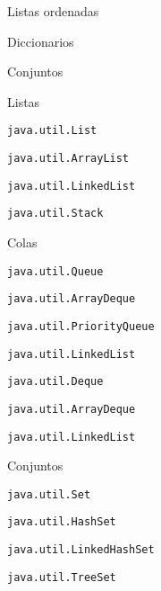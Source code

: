 \begin{longenum}
\begin{longenum}
        \begin{longenum}
            \item Listas ordenadas
            \item Diccionarios
            \item Conjuntos
        \end{longenum}
        \item Listas
        \begin{longenum}
            \item \texttt{java.util.List}
            \begin{longenum}
                \item \texttt{java.util.ArrayList}
                \item \texttt{java.util.LinkedList}
                \item \texttt{java.util.Stack}
            \end{longenum}
        \end{longenum}
        \item Colas
        \begin{longenum}
            \item \texttt{java.util.Queue}
            \begin{longenum}
                \item \texttt{java.util.ArrayDeque}
                \item \texttt{java.util.PriorityQueue}
                \item \texttt{java.util.LinkedList}
            \end{longenum}
            \item \texttt{java.util.Deque}
            \begin{longenum}
                \item \texttt{java.util.ArrayDeque}
                \item \texttt{java.util.LinkedList}
            \end{longenum}
        \end{longenum}
        \item Conjuntos
        \begin{longenum}
            \item \texttt{java.util.Set}
            \begin{longenum}
                \item \texttt{java.util.HashSet}
                \item \texttt{java.util.LinkedHashSet}
                \item \texttt{java.util.TreeSet}

\end{longenum}
\end{longenum}
\end{longenum}
\end{longenum}
